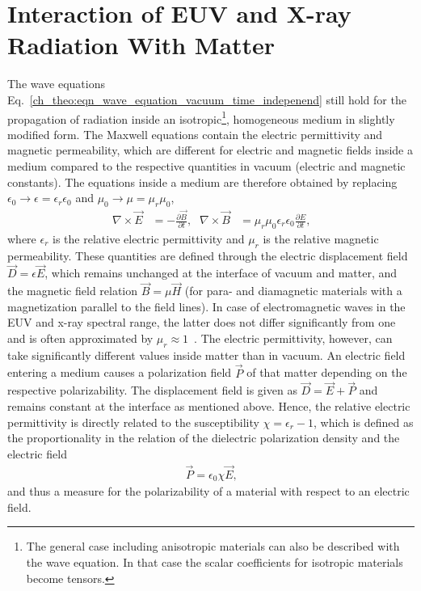 \section{Interaction of EUV and X-ray Radiation With Matter} \label{ch_theo:sec_interaction}
The wave equations Eq.~\eqref{ch_theo:eqn_wave_equation_vacuum_time_indepenend} still hold for the propagation of radiation inside an isotropic\footnote{The general case including anisotropic materials can also be described with the wave equation. In that case the scalar coefficients for isotropic materials become tensors.}, homogeneous medium in slightly modified form. The Maxwell equations contain the electric permittivity and magnetic permeability, which are different for electric and magnetic fields inside a medium compared to the respective quantities in vacuum (electric and magnetic constants). The equations inside a medium are therefore obtained by replacing $\epsilon_0 \rightarrow \epsilon = \epsilon_r \epsilon_0$ and $\mu_0 \rightarrow \mu = \mu_r \mu_0$,
\begin{align}
 \nabla \times \vec{E} & = -\frac{\partial \vec{B}}{\partial t}\text{,} & \nabla \times \vec{B} &= \mu_r \mu_0 \epsilon_r \epsilon_0 \frac{\partial E}{\partial t} \text{,}
\end{align}
where $\epsilon_r$ is the relative electric permittivity and $\mu_r$ is the relative magnetic permeability. These quantities are defined through the electric displacement field $\vec{D} = \epsilon \vec{E}$, which remains unchanged at the interface of vacuum and matter, and the magnetic field relation $\vec{B} = \mu \vec{H}$ (for para- and diamagnetic materials with a magnetization parallel to the field lines).  In case of electromagnetic waves in the EUV and x-ray spectral range, the latter does not differ significantly from one and is often approximated by $\mu_r \approx 1$~\cite{bergevin_interaction_2009}. The electric permittivity, however, can take significantly different values inside matter than in vacuum. An electric field entering a medium causes a polarization field $\vec{P}$ of that matter depending on the respective polarizability. The displacement field is given as $\vec{D} = \vec{E} + \vec{P}$ and remains constant at the interface as mentioned above. Hence, the relative electric permittivity is directly related to the susceptibility $\chi = \epsilon_r - 1$, which is defined as the proportionality in the relation of the dielectric polarization density and the electric field
\begin{align}
 \vec{P} = \epsilon_0 \chi \vec{E}\text{,}
\end{align}
and thus a measure for the polarizability of a material with respect to an electric field.

